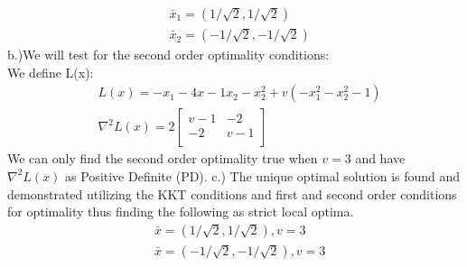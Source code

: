 \documentclass[12pt]{article}
\begin{document}
    \begin{align*}
        &\bar x_1 = (1/\sqrt{2} ,1/\sqrt{2}) \\
        &\bar x_2 = (-1/\sqrt{2} ,-1/\sqrt{2})
    \end{align*}
b.)We will test for the second order optimality conditions: \\
We define L(x): \\
    \begin{align*}
        &L(x) = -x_1 - 4x-1x_2 - x_2^2 + v (-x_1^2 - x_2^2 -1)\\
        &\nabla^2 L(x) = 2
        \begin{bmatrix}
            v- 1 & -2 \\
            -2 & v-1\\ 
        \end{bmatrix}
    \end{align*}
We can only find the second order optimality true when $v = 3$  and have $\nabla^2 L(x)$ as Positive Definite (PD). 
c.) The unique optimal solution is found and demonstrated utilizing the KKT conditions and first and second order conditions for optimality thus finding the following as strict local optima.
    \begin{align*}
        &\bar x = (1/\sqrt{2}, 1/\sqrt{2}), v = 3 \\ 
        &\bar x = (-1/\sqrt{2}, -1/\sqrt{2}), v = 3
    \end{align*}
\end{document}
